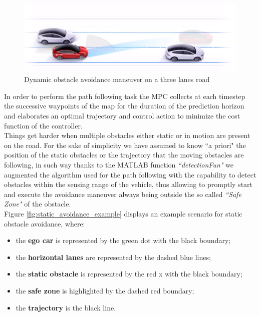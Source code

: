 \begin{figure}[H]
    \centering
    \includegraphics[width=1\textwidth]{Figures/dynamic_avoidance.png}
    \caption{Dynamic obstacle avoidance maneuver on a three lanes road}
      \label{fig:dynamic_avoidance}
\end{figure}
In order to perform the path following task the MPC collects at each timestep the successive waypoints of the map for the duration of the prediction horizon and elaborates an optimal trajectory and control action to minimize the cost function of the controller.
\\Things get harder when multiple obstacles either static or in motion are present on the road. For the sake of simplicity we have assumed to know ``a priori" the position of the static obstacles or the trajectory that the moving obstacles are following, in such way thanks to the MATLAB function \textit{``detectionFun"} we augmented the algorithm used for the path following with the capability to detect obstacles within the sensing range of the vehicle, thus allowing to promptly start and execute the avoidance maneuver always being outside the so called \textit{``Safe Zone"} of the obstacle.\\ Figure \ref{fig:static_avoidance_example} displays an example scenario for static obstacle avoidance, where: 
\begin{itemize}
    \item the \textbf{ego car} is represented by the green dot with the black boundary;
    \item the \textbf{horizontal lanes} are represented by the dashed blue lines;
    \item the \textbf{static obstacle} is represented by the red x with the black boundary;
    \item the \textbf{safe zone} is highlighted by the dashed red boundary;
    \item the \textbf{trajectory} is the black line.
\end{itemize} 


